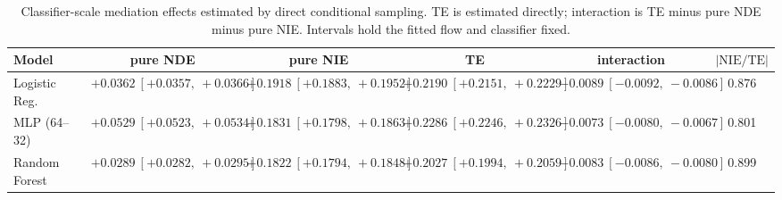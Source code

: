 \begin{table}[htbp]
  \centering
  \caption{Classifier-scale mediation effects estimated by direct conditional sampling. TE is estimated directly; interaction is TE minus pure NDE minus pure NIE. Intervals hold the fitted flow and classifier fixed.}
  \label{tab:german_synth_gap_overall}
  \begin{tabular}{lccccc}
    \toprule
    Model & pure NDE & pure NIE & TE & interaction & $|\mathrm{NIE}/\mathrm{TE}|$ \\
    \midrule
    Logistic Reg. & $+0.0362\ [+0.0357,\ +0.0366]$ & $+0.1918\ [+0.1883,\ +0.1952]$ & $+0.2190\ [+0.2151,\ +0.2229]$ & $-0.0089\ [-0.0092,\ -0.0086]$ & 0.876 \\
    MLP (64--32) & $+0.0529\ [+0.0523,\ +0.0534]$ & $+0.1831\ [+0.1798,\ +0.1863]$ & $+0.2286\ [+0.2246,\ +0.2326]$ & $-0.0073\ [-0.0080,\ -0.0067]$ & 0.801 \\
    Random Forest & $+0.0289\ [+0.0282,\ +0.0295]$ & $+0.1822\ [+0.1794,\ +0.1848]$ & $+0.2027\ [+0.1994,\ +0.2059]$ & $-0.0083\ [-0.0086,\ -0.0080]$ & 0.899 \\
    \bottomrule
  \end{tabular}
\end{table}